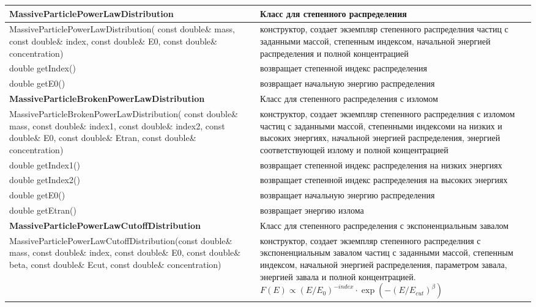 \begin{small}
	\label{MassiveParticleMethods1}
	\begin{xtabular}{|p{0.52\textwidth}|p{0.48\textwidth}|}
		\hline
		\textbf{MassiveParticlePowerLawDistribution} & Класс для степенного распределения\\
		\hline
		MassiveParticlePowerLawDistribution( const double\& mass, const double\& index, const double\& E0, const double\& concentration) & конструктор, создает экземпляр степенного распределния частиц с заданными массой, степенным индексом, начальной энергией распределения и полной концентрацией\\
		\hline
		double getIndex() & возвращает степенной индекс распределения\\
		\hline
		double getE0() & возвращает начальную энергию распределения\\
		\hline
		\textbf{MassiveParticleBrokenPowerLawDistribution} & Класс для степенного распределения с изломом\\
		\hline
		MassiveParticleBrokenPowerLawDistribution( const double\& mass, const double\& index1, const double\& index2, const double\& E0, const double\& Etran, const double\& concentration) & конструктор, создает экземпляр степенного распределния с изломом частиц с заданными массой, степенными индексоми на низких и высоких энергиях, начальной энергией распределения, энергией соответствующей излому и полной концентрацией\\
		\hline
		double getIndex1() & возвращает степенной индекс распределения на низких энергиях\\
		\hline
		double getIndex2() & возвращает степенной индекс распределения на высоких энергиях\\
		\hline
		double getE0() & возвращает начальную энергию распределения\\
		\hline
		double getEtran() & возвращает энергию излома\\
		\hline
		\textbf{MassiveParticlePowerLawCutoffDistribution} & Класс для степенного распределения с экспоненциальным завалом\\
		\hline
		MassiveParticlePowerLawCutoffDistribution(const double\& mass, const double\& index, const double\& E0, const double\& beta, const double\& Ecut, const double\& concentration) & конструктор, создает экземпляр степенного распределния с экспоненциальным завалом частиц с заданными массой, степенным индексом, начальной энергией распределения, параметром завала, энергией завала и полной концентрацией. $F(E)\propto (E/E_0)^{-index}\cdot\exp(-(E/E_{cut})^\beta)$\\

\end{xtabular}
\end{small}
